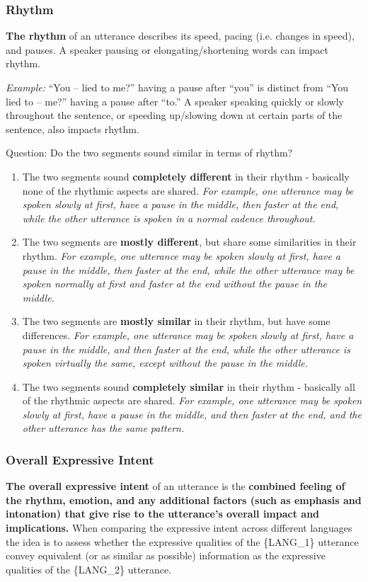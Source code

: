 \subsubsection{Rhythm}
\textbf{The rhythm} of an utterance describes its speed, pacing (i.e. changes in speed), and pauses. A speaker pausing or elongating/shortening words can impact rhythm. 
\begin{boxA}
\textit{Example:}
“You -- lied to me?” having a pause after “you” is distinct from “You lied to -- me?” having a pause after “to.” A speaker speaking quickly or slowly throughout the sentence, or speeding up/slowing down at certain parts of the sentence, also impacts rhythm.
\end{boxA}
Question: Do the two segments sound similar in terms of rhythm?
\begin{enumerate}
    \item The two segments sound \textbf{completely different} in their rhythm - basically none of the rhythmic aspects are shared.
    \textit{For example, one utterance may be spoken slowly at first, have a pause in the middle, then faster at the end, while the other utterance is spoken in a normal cadence throughout.}
    \item The two segments are \textbf{mostly different}, but share some similarities in their rhythm.
    \textit{For example, one utterance may be spoken slowly at first, have a pause in the middle, then faster at the end, while the other utterance may be spoken normally at first and faster at the end without the pause in the middle.}
    \item The two segments are \textbf{mostly similar} in their rhythm, but have some differences.
    \textit{For example, one utterance may be spoken slowly at first, have a pause in the middle, and then faster at the end, while the other utterance is spoken virtually the same, except without the pause in the middle.}
    \item The two segments sound \textbf{completely similar} in their rhythm - basically all of the rhythmic aspects are shared.
    \textit{For example, one utterance may be spoken slowly at first, have a pause in the middle, and then faster at the end, and the other utterance has the same pattern.}
\end{enumerate}

\subsubsection{Overall Expressive Intent}
\textbf{The overall expressive intent} of an utterance is the \textbf{combined feeling of the rhythm, emotion, and any additional factors (such as emphasis and intonation) that give rise to the utterance’s overall impact and implications.} When comparing the expressive intent across different languages the idea is to assess whether the expressive qualities of the \{LANG\_1\} utterance convey equivalent (or as similar as possible) information as the expressive qualities of the \{LANG\_2\} utterance.


